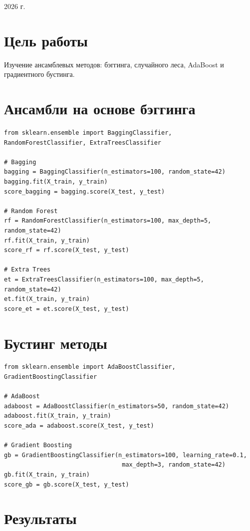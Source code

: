 \documentclass[a4paper,12pt]{article}
\begin{document}
\vfill
\begin{center}
    \large 2026 г.
\end{center}

\newpage

\section*{Цель работы}
Изучение ансамблевых методов: бэггинга, случайного леса, AdaBoost и градиентного бустинга.

\section*{Ансамбли на основе бэггинга}

\begin{lstlisting}
from sklearn.ensemble import BaggingClassifier, RandomForestClassifier, ExtraTreesClassifier

# Bagging
bagging = BaggingClassifier(n_estimators=100, random_state=42)
bagging.fit(X_train, y_train)
score_bagging = bagging.score(X_test, y_test)

# Random Forest
rf = RandomForestClassifier(n_estimators=100, max_depth=5, random_state=42)
rf.fit(X_train, y_train)
score_rf = rf.score(X_test, y_test)

# Extra Trees
et = ExtraTreesClassifier(n_estimators=100, max_depth=5, random_state=42)
et.fit(X_train, y_train)
score_et = et.score(X_test, y_test)
\end{lstlisting}

\section*{Бустинг методы}

\begin{lstlisting}
from sklearn.ensemble import AdaBoostClassifier, GradientBoostingClassifier

# AdaBoost
adaboost = AdaBoostClassifier(n_estimators=50, random_state=42)
adaboost.fit(X_train, y_train)
score_ada = adaboost.score(X_test, y_test)

# Gradient Boosting
gb = GradientBoostingClassifier(n_estimators=100, learning_rate=0.1, 
                                 max_depth=3, random_state=42)
gb.fit(X_train, y_train)
score_gb = gb.score(X_test, y_test)
\end{lstlisting}

\section*{Результаты}
\end{document}
